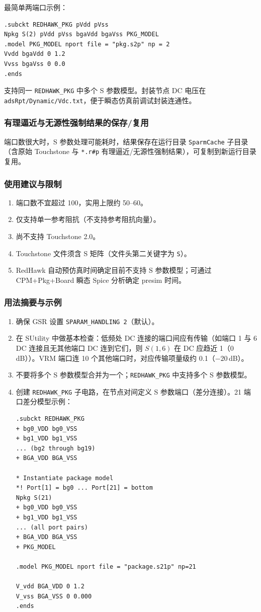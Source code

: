 最简单两端口示例：
\begin{lstlisting}
.subckt REDHAWK_PKG pVdd pVss
Npkg S(2) pVdd pVss bgaVdd bgaVss PKG_MODEL
.model PKG_MODEL nport file = "pkg.s2p" np = 2
Vvdd bgaVdd 0 1.2
Vvss bgaVss 0 0.0
.ends
\end{lstlisting}

支持同一 \texttt{REDHAWK\_PKG} 中多个 S 参数模型。封装节点 DC 电压在 \texttt{adsRpt/Dynamic/Vdc.txt}，便于瞬态仿真前调试封装连通性。

\subsubsection{有理逼近与无源性强制结果的保存/复用}
端口数很大时，S 参数处理可能耗时，结果保存在运行目录 \texttt{SparmCache} 子目录（含原始 Touchstone 与 \texttt{*.r\#p} 有理逼近/无源性强制结果），可复制到新运行目录复用。

\subsubsection{使用建议与限制}
\begin{enumerate}
  \item 端口数不宜超过 100，实用上限约 50--60。
  \item 仅支持单一参考阻抗（不支持参考阻抗向量）。
  \item 尚不支持 Touchstone 2.0。
  \item Touchstone 文件须含 S 矩阵（文件头第二关键字为 \texttt{S}）。
  \item RedHawk 自动预仿真时间确定目前不支持 S 参数模型；可通过 CPM+Pkg+Board 瞬态 Spice 分析确定 presim 时间。
\end{enumerate}

\subsubsection{用法摘要与示例}
\begin{enumerate}
  \item 确保 GSR 设置 \texttt{SPARAM\_HANDLING 2}（默认）。
  \item 在 SUtility 中做基本检查：低频处 DC 连接的端口间应有传输（如端口 1 与 6 DC 连接且无其他端口 DC 连到它们，则 $S(1,6)$ 在 DC 应趋近 1（0\,dB））。VRM 端口连 10 个其他端口时，对应传输项量级约 0.1（$-20$\,dB）。
  \item 不要将多个 S 参数模型合并为一个；\texttt{REDHAWK\_PKG} 中支持多个 S 参数模型。
  \item 创建 \texttt{REDHAWK\_PKG} 子电路，在节点对间定义 S 参数端口（差分连接）。21 端口差分模型示例：
\begin{lstlisting}
.subckt REDHAWK_PKG
+ bg0_VDD bg0_VSS
+ bg1_VDD bg1_VSS
... (bg2 through bg19)
+ BGA_VDD BGA_VSS

* Instantiate package model
*! Port[1] = bg0 ... Port[21] = bottom
Npkg S(21)
+ bg0_VDD bg0_VSS
+ bg1_VDD bg1_VSS
... (all port pairs)
+ BGA_VDD BGA_VSS
+ PKG_MODEL

.model PKG_MODEL nport file = "package.s21p" np=21

V_vdd BGA_VDD 0 1.2
V_vss BGA_VSS 0 0.000
.ends
\end{lstlisting}
\end{enumerate}

